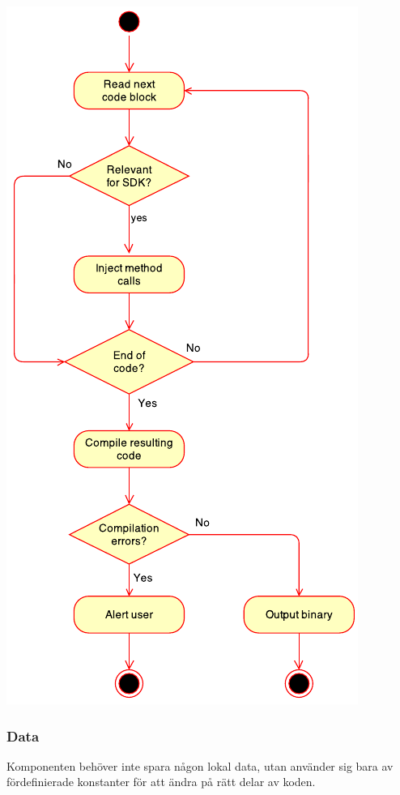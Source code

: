 \includegraphics[scale=1.0]{integrateState.pdf}

\subsubsection{Data}
Komponenten behöver inte spara någon lokal data, utan använder sig bara av fördefinierade konstanter för att ändra på rätt delar av koden.
